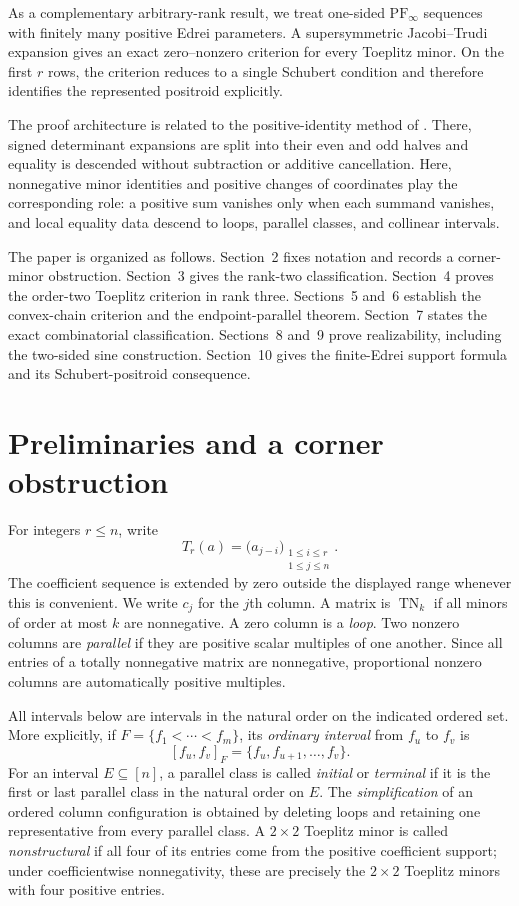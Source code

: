 \documentclass{amsart}
\numberwithin{equation}{section}
\theoremstyle{definition}
\theoremstyle{remark}
\DeclareMathOperator{\TN}{TN}
\newcommand{\PFinfty}{\mathrm{PF}_{\infty}}
\begin{document}
As a complementary arbitrary-rank result, we treat one-sided $\PFinfty$ sequences with finitely many positive Edrei parameters.  A supersymmetric Jacobi--Trudi expansion gives an exact zero--nonzero criterion for every Toeplitz minor.  On the first $r$ rows, the criterion reduces to a single Schubert condition and therefore identifies the represented positroid explicitly.

The proof architecture is related to the positive-identity method of \cite{GCQ}.  There, signed determinant expansions are split into their even and odd halves and equality is descended without subtraction or additive cancellation.  Here, nonnegative minor identities and positive changes of coordinates play the corresponding role: a positive sum vanishes only when each summand vanishes, and local equality data descend to loops, parallel classes, and collinear intervals.

The paper is organized as follows.  Section~2 fixes notation and records a corner-minor obstruction.  Section~3 gives the rank-two classification.  Section~4 proves the order-two Toeplitz criterion in rank three.  Sections~5 and~6 establish the convex-chain criterion and the endpoint-parallel theorem.  Section~7 states the exact combinatorial classification.  Sections~8 and~9 prove realizability, including the two-sided sine construction.  Section~10 gives the finite-Edrei support formula and its Schubert-positroid consequence.

\section{Preliminaries and a corner obstruction}

For integers $r\le n$, write
\begin{equation}\label{eq:toeplitz}
 T_r(a)=\bigl(a_{j-i}\bigr)_{\substack{1\le i\le r\\1\le j\le n}}.
\end{equation}
The coefficient sequence is extended by zero outside the displayed range whenever this is convenient.  We write $c_j$ for the $j$th column.  A matrix is $\TN_k$ if all minors of order at most $k$ are nonnegative.  A zero column is a \emph{loop}.  Two nonzero columns are \emph{parallel} if they are positive scalar multiples of one another.  Since all entries of a totally nonnegative matrix are nonnegative, proportional nonzero columns are automatically positive multiples.

All intervals below are intervals in the natural order on the indicated ordered set.  More explicitly, if $F=\{f_1<\cdots<f_m\}$, its \emph{ordinary interval} from $f_u$ to $f_v$ is
\[
 [f_u,f_v]_F=\{f_u,f_{u+1},\ldots,f_v\}.
\]
For an interval $E\subseteq[n]$, a parallel class is called \emph{initial} or \emph{terminal} if it is the first or last parallel class in the natural order on $E$.  The \emph{simplification} of an ordered column configuration is obtained by deleting loops and retaining one representative from every parallel class.  A $2\times2$ Toeplitz minor is called \emph{nonstructural} if all four of its entries come from the positive coefficient support; under coefficientwise nonnegativity, these are precisely the $2\times2$ Toeplitz minors with four positive entries.
\end{document}
